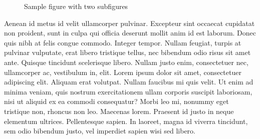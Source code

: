 \documentclass[english,master,dept460,male,cpp,cpdeclaration]{diploma}
\begin{document}
\begin{figure}
	\centering
	\hspace{3em} %
	\caption{Sample figure with two subfigures}
	\label{fig:TopLevelFigureLabel}
\end{figure}

Aenean id metus id velit ullamcorper pulvinar. Excepteur sint occaecat cupidatat non proident, sunt in culpa qui officia deserunt mollit anim id est laborum. Donec quis nibh at felis congue commodo. Integer tempor. Nullam feugiat, turpis at pulvinar vulputate, erat libero tristique tellus, nec bibendum odio risus sit amet ante. Quisque tincidunt scelerisque libero. Nullam justo enim, consectetuer nec, ullamcorper ac, vestibulum in, elit. Lorem ipsum dolor sit amet, consectetuer adipiscing elit. Aliquam erat volutpat. Nullam faucibus mi quis velit. Ut enim ad minima veniam, quis nostrum exercitationem ullam corporis suscipit laboriosam, nisi ut aliquid ex ea commodi consequatur? Morbi leo mi, nonummy eget tristique non, rhoncus non leo. Maecenas lorem. Praesent id justo in neque elementum ultrices. Pellentesque sapien. In laoreet, magna id viverra tincidunt, sem odio bibendum justo, vel imperdiet sapien wisi sed libero.
\end{document}
